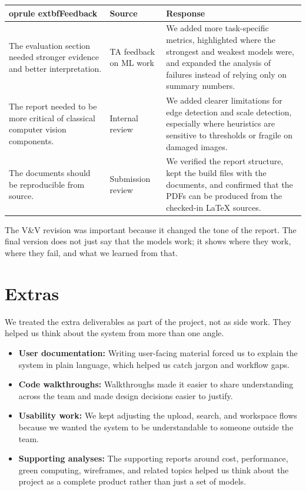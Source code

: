 \documentclass{article}
\begin{document}
\begin{tabularx}{\textwidth}{p{3.4cm} p{3.0cm} X}
	oprule
	extbf{Feedback} & \textbf{Source} & \textbf{Response} \\
\midrule
The evaluation section needed stronger evidence and better interpretation. & TA feedback on ML work & We added more task-specific metrics, highlighted where the strongest and weakest models were, and expanded the analysis of failures instead of relying only on summary numbers. \\
\addlinespace
The report needed to be more critical of classical computer vision components. & Internal review & We added clearer limitations for edge detection and scale detection, especially where heuristics are sensitive to thresholds or fragile on damaged images. \\
\addlinespace
The documents should be reproducible from source. & Submission review & We verified the report structure, kept the build files with the documents, and confirmed that the PDFs can be produced from the checked-in LaTeX sources. \\
\bottomrule
\end{tabularx}

The V\&V revision was important because it changed the tone of the report. The
final version does not just say that the models work; it shows where they work,
where they fail, and what we learned from that.

\section{Extras}

We treated the extra deliverables as part of the project, not as side work. They
helped us think about the system from more than one angle.

\begin{itemize}
	\item \textbf{User documentation:} Writing user-facing material forced us to explain the system in plain language, which helped us catch jargon and workflow gaps.
	\item \textbf{Code walkthroughs:} Walkthroughs made it easier to share understanding across the team and made design decisions easier to justify.
	\item \textbf{Usability work:} We kept adjusting the upload, search, and workspace flows because we wanted the system to be understandable to someone outside the team.
	\item \textbf{Supporting analyses:} The supporting reports around cost, performance, green computing, wireframes, and related topics helped us think about the project as a complete product rather than just a set of models.
\end{itemize}
\end{document}
